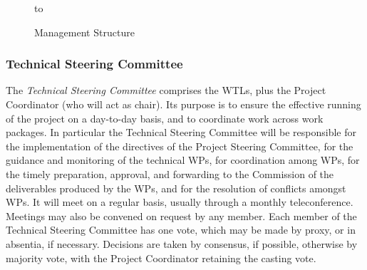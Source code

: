 \documentclass[a4paper,11pt]{article}
\begin{document}
\begin{figure}[ht!]
\vspace{-0.28in}
\begin{center}
\centerline{\hspace{0.6in} \hbox to }
\end{center}
\vspace{-1.4in}
\caption{Management Structure}
\label{fig:management}
\end{figure}



\subsubsection*{Technical Steering Committee}
\vspace{-5pt}

The \emph{Technical Steering Committee} comprises the WTLs, plus the
Project Coordinator (who will act as chair).  Its purpose is to ensure
the effective running of the project on a day-to-day basis, and to
coordinate work across work packages.  In particular the Technical Steering
Committee will be
responsible for the implementation of the directives of the Project Steering
Committee, for the
guidance and monitoring of the technical WPs, for coordination among
WPs, for  the timely preparation, approval, and forwarding to the Commission
of the deliverables produced by the WPs, and for the resolution of conflicts
amongst WPs.  It will meet on a regular basis, usually through a monthly
teleconference.  Meetings may also be convened on request by any member.
Each member of the Technical Steering Committee has one vote,
which may be made by proxy, or in absentia, if necessary.  
Decisions are taken by consensus, if possible, otherwise by majority vote, 
with the
Project Coordinator retaining the casting vote.
\end{document}
